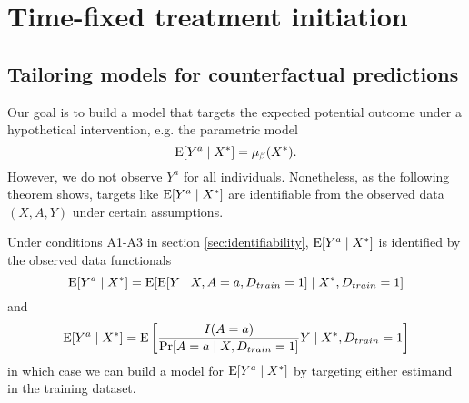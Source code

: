
\section{Time-fixed treatment initiation} \label{sec:appendixa}

    \subsection{Tailoring models for counterfactual predictions}\label{sec:model_proof}
    Our goal is to build a model that targets the expected potential outcome under a hypothetical intervention, e.g. the parametric model 
    $$\operatorname{E}[Y^a \mid X^*] = \mu_{\beta}(X^*).$$
    However, we do not observe $Y^a$ for all individuals. Nonetheless, as the following theorem shows, targets like $\operatorname{E}[Y^a \mid X^*]$ are identifiable from the observed data $(X, A, Y)$ under certain assumptions. 
    
    \begin{theorem}
     Under conditions A1-A3 in section \ref{sec:identifiability}, $\operatorname{E}[Y^a \mid X^*]$ is identified by the observed data functionals
    \begin{equation}
        \operatorname{E}[Y^a \mid X^*] = \operatorname{E}[\operatorname{E}[Y \mid X, A = a, D_{train} = 1] \mid X^*, D_{train} = 1]
    \end{equation}
    and
    \begin{equation}
        \operatorname{E}[Y^a \mid X^*] = \operatorname{E}\left[\frac{I(A = a)}{\Pr[A = a \mid X, D_{train} = 1]} Y \mid X^*, D_{train} = 1\right]
    \end{equation}
    in which case we can build a model for $\operatorname{E}[Y^a \mid X^*]$ by targeting either estimand in the training dataset.
    \end{theorem}
    
